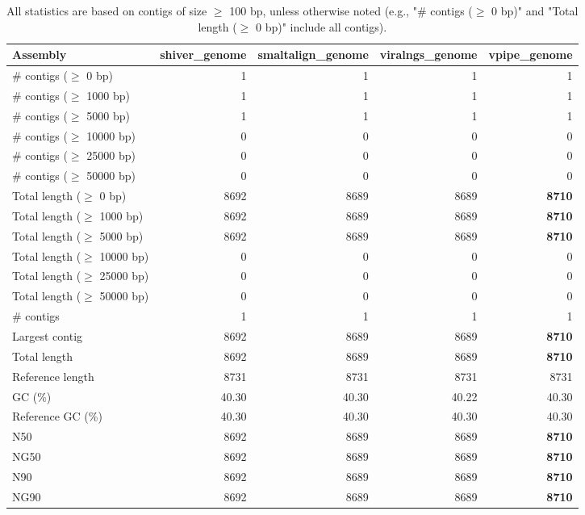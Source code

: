 \documentclass[12pt,a4paper]{article}
\begin{document}
\begin{table}[ht]
\begin{center}
\caption{All statistics are based on contigs of size $\geq$ 100 bp, unless otherwise noted (e.g., "\# contigs ($\geq$ 0 bp)" and "Total length ($\geq$ 0 bp)" include all contigs).}
\begin{tabular}{|l*{4}{|r}|}
\hline
Assembly & shiver\_genome & smaltalign\_genome & viralngs\_genome & vpipe\_genome \\ \hline
\# contigs ($\geq$ 0 bp) & 1 & 1 & 1 & 1 \\ \hline
\# contigs ($\geq$ 1000 bp) & 1 & 1 & 1 & 1 \\ \hline
\# contigs ($\geq$ 5000 bp) & 1 & 1 & 1 & 1 \\ \hline
\# contigs ($\geq$ 10000 bp) & 0 & 0 & 0 & 0 \\ \hline
\# contigs ($\geq$ 25000 bp) & 0 & 0 & 0 & 0 \\ \hline
\# contigs ($\geq$ 50000 bp) & 0 & 0 & 0 & 0 \\ \hline
Total length ($\geq$ 0 bp) & 8692 & 8689 & 8689 & {\bf 8710} \\ \hline
Total length ($\geq$ 1000 bp) & 8692 & 8689 & 8689 & {\bf 8710} \\ \hline
Total length ($\geq$ 5000 bp) & 8692 & 8689 & 8689 & {\bf 8710} \\ \hline
Total length ($\geq$ 10000 bp) & 0 & 0 & 0 & 0 \\ \hline
Total length ($\geq$ 25000 bp) & 0 & 0 & 0 & 0 \\ \hline
Total length ($\geq$ 50000 bp) & 0 & 0 & 0 & 0 \\ \hline
\# contigs & 1 & 1 & 1 & 1 \\ \hline
Largest contig & 8692 & 8689 & 8689 & {\bf 8710} \\ \hline
Total length & 8692 & 8689 & 8689 & {\bf 8710} \\ \hline
Reference length & 8731 & 8731 & 8731 & 8731 \\ \hline
GC (\%) & 40.30 & 40.30 & 40.22 & 40.30 \\ \hline
Reference GC (\%) & 40.30 & 40.30 & 40.30 & 40.30 \\ \hline
N50 & 8692 & 8689 & 8689 & {\bf 8710} \\ \hline
NG50 & 8692 & 8689 & 8689 & {\bf 8710} \\ \hline
N90 & 8692 & 8689 & 8689 & {\bf 8710} \\ \hline
NG90 & 8692 & 8689 & 8689 & {\bf 8710} \\ \hline

\end{tabular}
\end{center}
\end{table}
\end{document}
